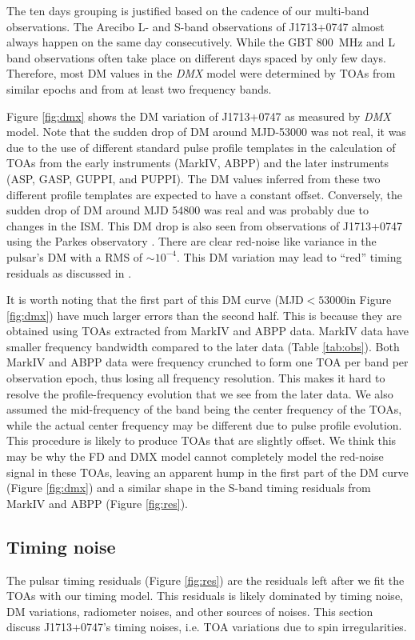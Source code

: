 The ten days grouping is justified based on the cadence of our multi-band
observations.
The Arecibo L- and S-band observations of J1713+0747 almost always happen on
the same day consecutively.
While the GBT 800~MHz and L band observations often take place on different
days spaced by only few days.
Therefore, most DM values in the {\it DMX} model were determined by TOAs from
similar epochs and from at
least two frequency bands. 

Figure \ref{fig:dmx} shows the DM variation of
J1713+0747 as measured by {\it DMX} model.
Note that the sudden drop of DM around MJD-53000 was not real, it was due to
the use of different standard pulse profile templates in the calculation of
TOAs from the early instruments (MarkIV, ABPP) and the later instruments
(ASP, GASP, GUPPI, and PUPPI). The DM values inferred from these two different
profile templates are expected to have a constant offset.
Conversely, the sudden drop of DM around MJD 54800 was real and was probably
due to changes in the ISM. This DM drop is also seen from observations of
J1713+0747 using the Parkes observatory \citep{kcs+13}.
There are clear red-noise like variance in the pulsar's DM with a RMS of
$\sim10^{-4}$. 
This DM variation may lead to ``red'' timing residuals as discussed in \citealt{kcs+13}.

It is worth noting that the first part of this DM curve (MJD$<53000$in
Figure \ref{fig:dmx}) have much larger errors than the second half.
This is because they are obtained using TOAs extracted from
MarkIV and ABPP data. MarkIV data have smaller frequency bandwidth 
compared to the later data (Table \ref{tab:obs}).
Both MarkIV and ABPP data were frequency crunched to form one TOA per band per
observation epoch, thus losing all frequency resolution. This makes it hard to
resolve the profile-frequency evolution that we see from the later data. We
also assumed the mid-frequency of the band being the center frequency 
of the TOAs, while the actual center frequency may be different due to pulse
profile evolution. This procedure is likely to produce TOAs that are slightly offset. We think this may be why the FD and
DMX model cannot completely model the red-noise signal in these TOAs, leaving
an apparent hump in the first part of the DM curve (Figure \ref{fig:dmx}) and 
a similar shape in the S-band timing residuals from MarkIV and ABPP (Figure
\ref{fig:res}).


\subsection{Timing noise}
\label{sec:noise}
The pulsar timing residuals (Figure \ref{fig:res}) are the residuals left
after we fit the TOAs with our timing model. 
This residuals is likely dominated by timing noise, DM variations, radiometer 
noises, and other sources of noises. This section discuss J1713+0747's
timing noises, i.e. TOA variations due to spin irregularities.

